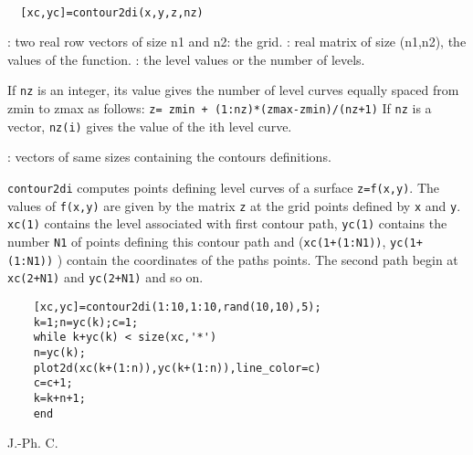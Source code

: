 
\begin{mandesc}
  \\
\end{mandesc}
\begin{calling_sequence}
\begin{verbatim}
  [xc,yc]=contour2di(x,y,z,nz)
\end{verbatim}
\end{calling_sequence}

\begin{parameters}
  \begin{varlist}
    : two real row vectors of size n1 and n2: the grid.
    : real matrix of size (n1,n2), the values of the function.
    : the level values or the number of levels.
    \begin{varlist}
      \vname{-}If \verb!nz! is an integer, its value gives the number of
      level curves  equally spaced from zmin to zmax as follows:
      \verb!z= zmin + (1:nz)*(zmax-zmin)/(nz+1)!
      \vname{-} If \verb!nz! is a vector, \verb!nz(i)! gives the value of the ith level curve.
    \end{varlist}
    : vectors of same sizes containing the contours definitions.
  \end{varlist}
\end{parameters}

\begin{mandescription}
  \verb!contour2di! computes points defining level curves of a surface \verb!z=f(x,y)!.
  The values of \verb!f(x,y)! are given by the matrix \verb!z! at the grid points
  defined by \verb!x! and \verb!y!.
  \verb!xc(1)! contains the level associated with first contour path,
  \verb!yc(1)! contains the number \verb!N1! of points defining this contour path
  and (\verb!xc(1+(1:N1))!, \verb!yc(1+(1:N1))! ) contain the coordinates
  of the paths points.
  The second path begin at \verb!xc(2+N1)! and \verb!yc(2+N1)! and so on.
\end{mandescription}

\begin{examples}
  \begin{Verbatim}
    [xc,yc]=contour2di(1:10,1:10,rand(10,10),5);
    k=1;n=yc(k);c=1;
    while k+yc(k) < size(xc,'*')
    n=yc(k);
    plot2d(xc(k+(1:n)),yc(k+(1:n)),line_color=c)
    c=c+1;
    k=k+n+1;
    end
  \end{Verbatim}
\end{examples}

\begin{manseealso}
\end{manseealso}
\begin{authors}
  J.-Ph. C.
\end{authors}
